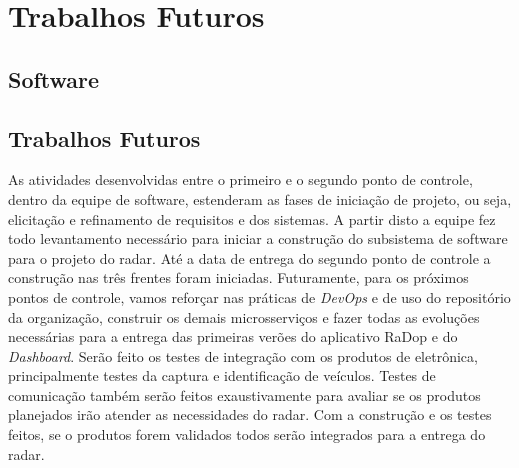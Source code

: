 \chapter{Trabalhos Futuros} %
\label{cha:trabalhos-futuros}

\section{Software}

\section{Trabalhos Futuros}

As atividades desenvolvidas entre o primeiro e o segundo ponto de controle, dentro da equipe de software, estenderam as fases de iniciação de projeto, ou seja, elicitação e refinamento de requisitos e dos sistemas. A partir disto a equipe fez todo levantamento necessário para iniciar a construção do subsistema de software para o projeto do radar. Até a data de entrega do segundo ponto de controle a construção nas três frentes foram iniciadas. Futuramente, para os próximos pontos de controle, vamos reforçar nas práticas de \textit{DevOps} e de uso do repositório da organização, construir os demais microsserviços e fazer todas as evoluções necessárias para a entrega das primeiras verões do aplicativo RaDop e do \textit{Dashboard}. Serão feito os testes de integração com os produtos de eletrônica, principalmente testes da captura e identificação de veículos. Testes de comunicação também serão feitos exaustivamente para avaliar se os produtos planejados irão atender as necessidades do radar. Com a construção e os testes feitos, se o produtos forem validados todos serão integrados para a entrega do radar.

